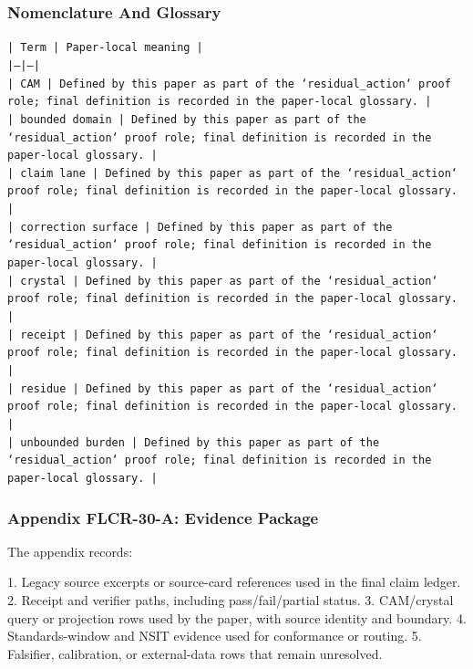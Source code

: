 \documentclass[11pt]{article}
\begin{document}
\subsubsection*{Nomenclature And Glossary}

\noindent\texttt{| Term | Paper-local meaning |}\\
\noindent\texttt{|---|---|}\\
\noindent\texttt{| CAM | Defined by this paper as part of the `residual\_action` proof role; final definition is recorded in the paper-local glossary. |}\\
\noindent\texttt{| bounded domain | Defined by this paper as part of the `residual\_action` proof role; final definition is recorded in the paper-local glossary. |}\\
\noindent\texttt{| claim lane | Defined by this paper as part of the `residual\_action` proof role; final definition is recorded in the paper-local glossary. |}\\
\noindent\texttt{| correction surface | Defined by this paper as part of the `residual\_action` proof role; final definition is recorded in the paper-local glossary. |}\\
\noindent\texttt{| crystal | Defined by this paper as part of the `residual\_action` proof role; final definition is recorded in the paper-local glossary. |}\\
\noindent\texttt{| receipt | Defined by this paper as part of the `residual\_action` proof role; final definition is recorded in the paper-local glossary. |}\\
\noindent\texttt{| residue | Defined by this paper as part of the `residual\_action` proof role; final definition is recorded in the paper-local glossary. |}\\
\noindent\texttt{| unbounded burden | Defined by this paper as part of the `residual\_action` proof role; final definition is recorded in the paper-local glossary. |}\\

\subsubsection*{Appendix FLCR-30-A: Evidence Package}

The appendix records:

1. Legacy source excerpts or source-card references used in the final claim ledger.
2. Receipt and verifier paths, including pass/fail/partial status.
3. CAM/crystal query or projection rows used by the paper, with source identity and boundary.
4. Standards-window and NSIT evidence used for conformance or routing.
5. Falsifier, calibration, or external-data rows that remain unresolved.
\end{document}
